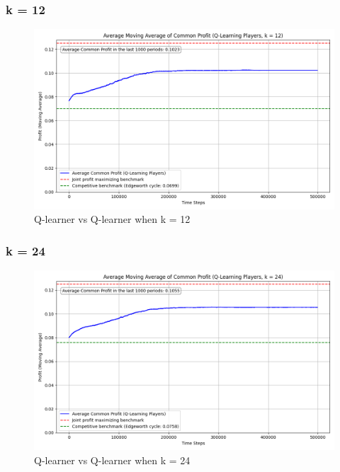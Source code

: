 \documentclass{article}
\begin{document}
\subsubsection{k = 12}
\begin{figure}[H]
    \centering
    \includegraphics[scale = 0.45]{K=12.png}
    \caption{Q-learner vs Q-learner when k = 12}
    \label{fig: QlearnervQlearnerK=12}
\end{figure}

\subsubsection{k = 24}
\begin{figure}[H]
    \centering
    \includegraphics[scale = 0.45]{K=24.png}
    \caption{Q-learner vs Q-learner when k = 24}
    \label{fig: QlearnervQlearnerK=24}
\end{figure}
\end{document}
